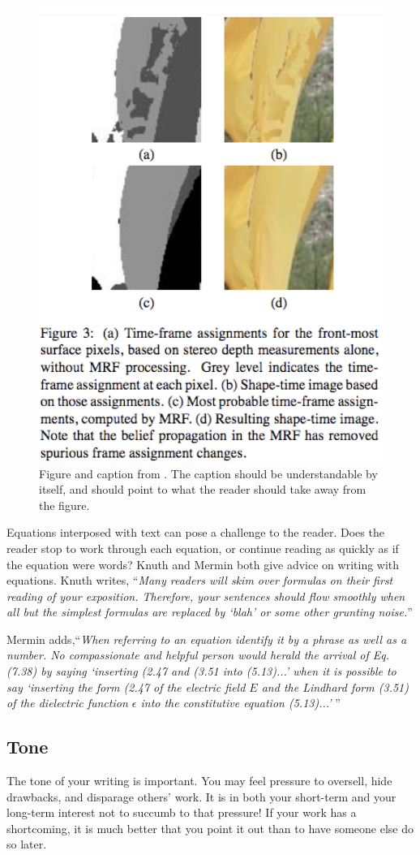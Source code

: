 \begin{figure}
    \centerline{
        \includegraphics[width=0.55\linewidth]{figures/papers/shapetimeFig.jpg}}
    \caption{Figure and caption from \cite{FreemanShapetime}. The caption should be understandable by itself, and should point to what the reader should take away from the figure. }
    \label{fig:shapetime}
\end{figure}

Equations interposed with text can pose a challenge to the reader.  Does the reader stop to work through each equation, or continue reading as quickly as if the equation were words?  Knuth \cite{Knuth1989} and Mermin \cite{Mermin1989} both give advice on writing with equations.  Knuth writes,
``{\em Many readers will skim over formulas on their first reading of your exposition.  Therefore, your sentences should flow smoothly when all but the simplest formulas are replaced by `blah' or some other grunting noise.}''

Mermin adds,``{\em When referring to an equation identify it by a phrase as well as a number.  No compassionate and helpful person would herald the arrival of Eq. (7.38) by saying `inserting (2.47 and (3.51 into (5.13)...' when it is possible to say `inserting the form (2.47 of the electric field $E$ and the Lindhard form (3.51) of the dielectric function $\epsilon$ into the constitutive equation (5.13)...' }''


\subsection{Tone}

The tone of your writing is important.  You may feel pressure to oversell, hide drawbacks, and disparage others’ work.  It is in both your short-term and your long-term interest not to succumb to that pressure!  If your work has a shortcoming, it is much better that you point it out than to have someone else do so later.

